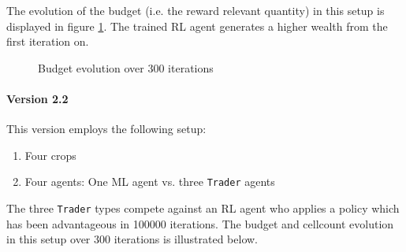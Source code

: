 \documentclass[a4paper,12pt]{article} %
\begin{document}
The evolution of the budget (i.e. the reward relevant quantity) in this setup is displayed in figure \ref{fig:budget MLvsIntros}.
The trained RL agent generates a higher wealth from the first iteration on. 


\begin{figure}[H]
    \centering
    {
	  }
    \caption{Budget evolution over 300 iterations}
    \label{fig:budget MLvsIntros}
\end{figure}


\newpage
\paragraph{Version 2.2}
This version employs the following setup:
\begin{enumerate}
    \item Four crops
    \item Four agents: One ML agent vs. three \texttt{Trader} agents
\end{enumerate}

The three \texttt{Trader} types compete against an RL agent who applies a policy which has been advantageous in 100000 iterations. The budget and cellcount evolution in this setup over 300 iterations is illustrated below.

\end{document}

